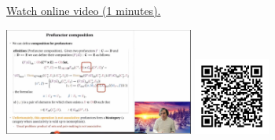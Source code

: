 
\begin{minipage}{10cm}
    \href{https://act4e-spring21.netlify.app/videos/spring2021-profunctors:prof-comp.html}{Watch online video (1 minutes).}
        
    \href{https://act4e-spring21.netlify.app/videos/spring2021-profunctors:prof-comp.html}{\includegraphics[height=3.5cm]{spring2021-profunctors:prof-comp/thumbnails.jpg}}
    \href{https://act4e-spring21.netlify.app/videos/spring2021-profunctors:prof-comp.html}{\includegraphics[height=2.5cm]{spring2021-profunctors:prof-comp/qrcode.png}}
\end{minipage}
